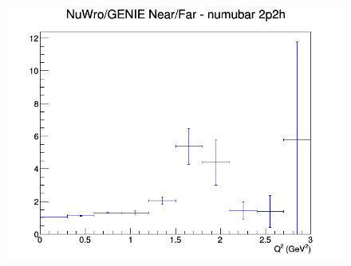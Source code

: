 \begin{figure}[h]
\endminipage
{}
\includegraphics[width=\linewidth]{eff_Q2/FGT/ratios/2p2h_NuWro_GENIE_numubar_NF_Q2.png}
\endminipage
\newline
\end{figure}
\clearpage
